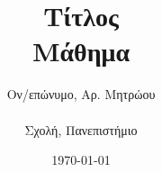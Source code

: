 \documentclass[11pt, a4paper]{article}
\begin{document}
\gr

\title{Τίτλος \\ \Large Μάθημα}
\author{Ον/επώνυμο, Αρ. Μητρώου \\ \\
        \small Σχολή, Πανεπιστήμιο}
\date{\today}

\maketitle











\end{document}
